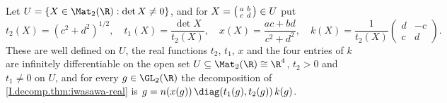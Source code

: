 Let $U=\{X\in\Mat_2(\R):\det X\neq0\}$, and for $X=\begin{psmallmatrix}a&b\\c&d\end{psmallmatrix}\in U$ put
\[
  t_2(X)=(c^2+d^2)^{1/2},\quad t_1(X)=\frac{\det X}{t_2(X)},\quad x(X)=\frac{ac+bd}{c^2+d^2},\quad
  k(X)=\frac1{t_2(X)}\begin{pmatrix}d&-c\\c&d\end{pmatrix}.
\]
These are well defined on $U$, the real functions $t_2$, $t_1$, $x$ and the four entries of $k$ are infinitely
differentiable on the open set $U\subseteq\Mat_2(\R)\cong\R^4$, $t_2>0$ and $t_1\neq0$ on $U$, and for every
$g\in\GL_2(\R)$ the decomposition of \cref{I.decomp.thm:iwasawa-real} is $g=n(x(g))\,\diag(t_1(g),t_2(g))\,k(g)$.
